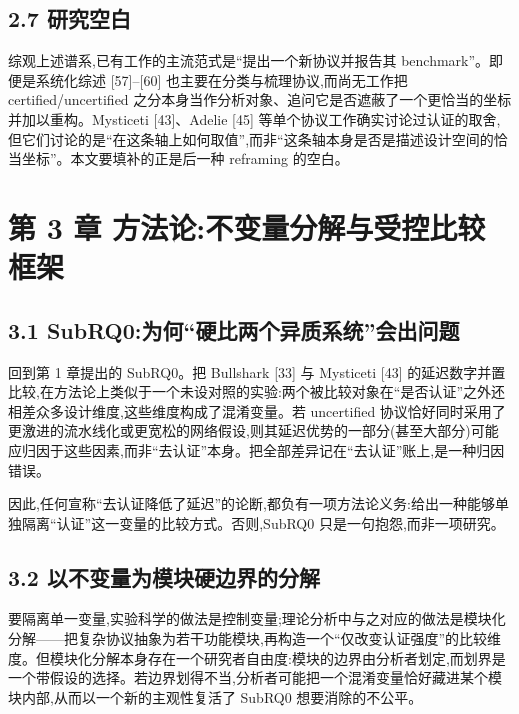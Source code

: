 \documentclass[UTF8,fontset=windows,a4paper,11pt]{ctexart}
\begin{document}
\subsection{2.7 研究空白}\label{ux7814ux7a76ux7a7aux767d}

综观上述谱系,已有工作的主流范式是``提出一个新协议并报告其 benchmark''。即便是系统化综述 {[}57{]}--{[}60{]} 也主要在分类与梳理协议,而尚无工作把 certified/uncertified 之分本身当作分析对象、追问它是否遮蔽了一个更恰当的坐标并加以重构。Mysticeti {[}43{]}、Adelie {[}45{]} 等单个协议工作确实讨论过认证的取舍,但它们讨论的是``在这条轴上如何取值'',而非``这条轴本身是否是描述设计空间的恰当坐标''。本文要填补的正是后一种 reframing 的空白。

\section{第 3 章
方法论:不变量分解与受控比较框架}\label{ux7b2c-3-ux7ae0-ux65b9ux6cd5ux8bbaux4e0dux53d8ux91cfux5206ux89e3ux4e0eux53d7ux63a7ux6bd4ux8f83ux6846ux67b6}

\subsection{3.1
SubRQ0:为何``硬比两个异质系统''会出问题}\label{subrq0ux4e3aux4f55ux786cux6bd4ux4e24ux4e2aux5f02ux8d28ux7cfbux7edfux4f1aux51faux95eeux9898}

回到第 1 章提出的 SubRQ0。把 Bullshark {[}33{]} 与 Mysticeti {[}43{]}
的延迟数字并置比较,在方法论上类似于一个未设对照的实验:两个被比较对象在``是否认证''之外还相差众多设计维度,这些维度构成了混淆变量。若
uncertified
协议恰好同时采用了更激进的流水线化或更宽松的网络假设,则其延迟优势的一部分(甚至大部分)可能应归因于这些因素,而非``去认证''本身。把全部差异记在``去认证''账上,是一种归因错误。

因此,任何宣称``去认证降低了延迟''的论断,都负有一项方法论义务:给出一种能够单独隔离``认证''这一变量的比较方式。否则,SubRQ0
只是一句抱怨,而非一项研究。

\subsection{3.2
以不变量为模块硬边界的分解}\label{ux4ee5ux4e0dux53d8ux91cfux4e3aux6a21ux5757ux786cux8fb9ux754cux7684ux5206ux89e3}

要隔离单一变量,实验科学的做法是控制变量;理论分析中与之对应的做法是模块化分解------把复杂协议抽象为若干功能模块,再构造一个``仅改变认证强度''的比较维度。但模块化分解本身存在一个研究者自由度:模块的边界由分析者划定,而划界是一个带假设的选择。若边界划得不当,分析者可能把一个混淆变量恰好藏进某个模块内部,从而以一个新的主观性复活了
SubRQ0 想要消除的不公平。
\end{document}
